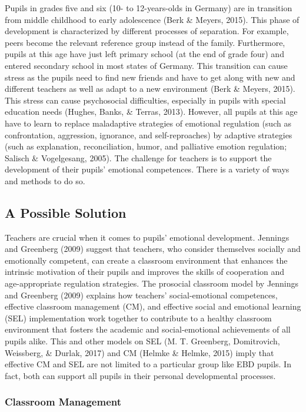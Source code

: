 \documentclass[11.5pt]{sig-alternate} %
\begin{document}
\begin{large}
Pupils in grades five and six (10- to 12-years-olds in Germany) are in transition from middle childhood to early adolescence (Berk \& Meyers, 2015). This phase of development is characterized by different processes of separation. For example, peers become the relevant reference group instead of the family. Furthermore, pupils at this age have just left primary school (at the end of grade four) and entered secondary school in most states of Germany. This transition can cause stress as the pupils need to find new friends and have to get along with new and different teachers as well as adapt to a new environment (Berk \& Meyers, 2015). This stress can cause psychosocial difficulties, especially in pupils with special education needs (Hughes, Banks, \& Terras, 2013). However, all pupils at this age have to learn to replace maladaptive strategies of emotional regulation (such as confrontation, aggression, ignorance, and self-reproaches) by adaptive strategies (such as explanation, reconciliation, humor, and palliative emotion regulation; Salisch \& Vogelgesang, 2005). The challenge for teachers is to support the development of their pupils’ emotional competences. There is a variety of ways and methods to do so.

\subsection*{A Possible Solution}

Teachers are crucial when it comes to pupils’ emotional development. Jennings and Greenberg (2009) suggest that teachers, who consider themselves socially and emotionally competent, can create a classroom environment that enhances the intrinsic motivation of their pupils and improves the skills of cooperation and age-appropriate regulation strategies. The prosocial classroom model by Jennings and Greenberg (2009) explains how teachers’ social-emotional competences, effective classroom management (CM), and effective social and emotional learning (SEL) implementation work together to contribute to a healthy classroom environment that fosters the academic and social-emotional achievements of all pupils alike. This and other models on SEL (M. T. Greenberg, Domitrovich, Weissberg, \& Durlak, 2017) and CM (Helmke \& Helmke, 2015) imply that effective CM and SEL are not limited to a particular group like EBD pupils. In fact, both can support all pupils in their personal developmental processes. 

\subsubsection*{Classroom Management} 


\end{large}
\end{document}
